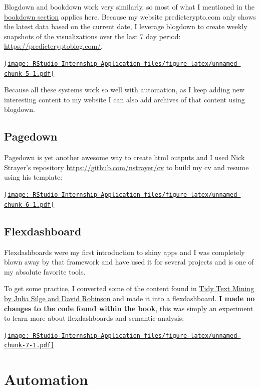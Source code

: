 \documentclass[
]{book}
\begin{document}
Blogdown\citep{R-blogdown} and bookdown work very similarly, so most of what I mentioned in the \protect\hyperlink{bookdown}{bookdown section} applies here. Because my website predictcrypto.com only shows the latest data based on the current date, I leverage blogdown to create weekly snapshots of the visualizations over the last 7 day period: \url{https://predictcryptoblog.com/}.

\href{https://predictcryptoblog.com/}{\texttt{[image: RStudio-Internship-Application\_files/figure-latex/unnamed-chunk-5-1.pdf]}}

Because all these systems work so well with automation, as I keep adding new interesting content to my website I can also add archives of that content using blogdown.

\hypertarget{pagedown}{%
\subsection{Pagedown}\label{pagedown}}

Pagedown\citep{R-pagedown} is yet another awesome way to create html outputs and I used Nick Strayer's repository \url{https://github.com/nstrayer/cv} to build my cv and resume using his template:

\href{https://ricky-cv.netlify.com/resume}{\texttt{[image: RStudio-Internship-Application\_files/figure-latex/unnamed-chunk-6-1.pdf]}}

\hypertarget{flexdashboard}{%
\subsection{Flexdashboard}\label{flexdashboard}}

Flexdashboards\citep{R-flexdashboard} were my first introduction to shiny apps and I was completely blown away by that framework and have used it for several projects and is one of my absolute favorite tools.

To get some practice, I converted some of the content found in \href{https://www.tidytextmining.com/}{Tidy Text Mining by Julia Silge and David Robinson} and made it into a flexdashboard. \textbf{I made no changes to the code found within the book}, this was simply an experiment to learn more about flexdashboards and semantic analysis:

\href{https://predictcrypto.shinyapps.io/SemanticAnalysisExample/}{\texttt{[image: RStudio-Internship-Application\_files/figure-latex/unnamed-chunk-7-1.pdf]}}

\hypertarget{automation}{%
\section{Automation}\label{automation}}
\end{document}
